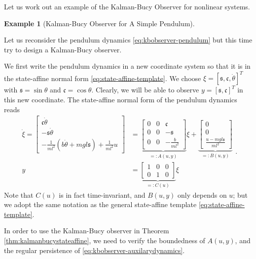 \documentclass[
]{book}
\theoremstyle{definition}
\theoremstyle{definition}
\newtheorem{example}{Example}[chapter]
\theoremstyle{definition}
\theoremstyle{definition}
\theoremstyle{remark}
\begin{document}
Let us work out an example of the Kalman-Bucy Observer for nonlinear systems.

\begin{example}[Kalman-Bucy Observer for A Simple Pendulum]
\protect\hypertarget{exm:pendulumkbobserver}{}\label{exm:pendulumkbobserver}

Let us reconsider the pendulum dynamics \eqref{eq:kbobserver-pendulum} but this time try to design a Kalman-Bucy observer.

We first write the pendulum dynamics in a new coordinate system so that it is in the state-affine normal form \eqref{eq:state-affine-template}. We choose \(\xi = [\mathfrak{s},\mathfrak{c},\dot{\theta}]^T\) with \(\mathfrak{s} = \sin \theta\) and \(\mathfrak{c} = \cos \theta\). Clearly, we will be able to observe \(y = [\mathfrak{s},\mathfrak{c}]^T\) in this new coordinate. The state-affine normal form of the pendulum dynamics reads
\begin{equation}
\begin{split}
\dot{\xi} = \begin{bmatrix}
\mathfrak{c} \dot{\theta} \\
- \mathfrak{s} \dot{\theta} \\
- \frac{1}{ml^2} (b \dot{\theta} + mgl \mathfrak{s} ) +  \frac{1}{ml^2} u
\end{bmatrix} & = 
\underbrace{\begin{bmatrix}
0 & 0 & \mathfrak{c} \\
0 & 0 & -\mathfrak{s} \\
0 & 0 & -\frac{b}{ml^2}
\end{bmatrix}}_{=:A(u,y)} \xi + 
\underbrace{\begin{bmatrix}
0 \\ 0 \\ \frac{u - mgl \mathfrak{s}}{ml^2}
\end{bmatrix}}_{=:B(u,y)} \\
y & = \underbrace{\begin{bmatrix}
1 & 0 & 0 \\
0 & 1 & 0
\end{bmatrix}}_{=:C(u)} \xi
\end{split}.
\label{eq:pendulum-state-affine}
\end{equation}
Note that \(C(u)\) is in fact time-invariant, and \(B(u,y)\) only depends on \(u\); but we adopt the same notation as the general state-affine template \eqref{eq:state-affine-template}.

In order to use the Kalman-Bucy observer in Theorem \ref{thm:kalmanbucystateaffine}, we need to verify the boundedness of \(A(u,y)\), and the regular persistence of \eqref{eq:kbobserver-auxilarydynamics}.


\end{example}
\end{document}
